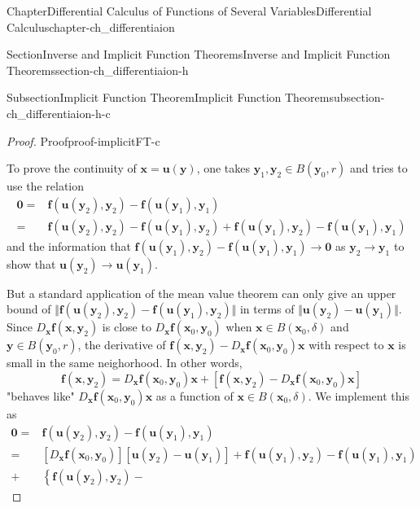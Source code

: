 \documentclass[oneside,10pt,]{book}
\numberwithin{equation}{section}
\newcommand{\bff}{\mathbf{f}}
\newcommand{\bx}{\mathbf{x}}
\newcommand{\by}{\mathbf{y}}
\newcommand{\amp}{&}
\begin{document}
\begin{chapterptx}{Chapter}{Differential Calculus of Functions of Several Variables}{}{Differential Calculus}{}{}{chapter-ch_differentiaion}
\begin{sectionptx}{Section}{Inverse and Implicit Function Theorems}{}{Inverse and Implicit Function Theorems}{}{}{section-ch_differentiaion-h}
\begin{subsectionptx}{Subsection}{Implicit Function Theorem}{}{Implicit Function Theorem}{}{}{subsection-ch_differentiaion-h-c}
\begin{proof}{Proof}{}{proof-implicitFT-c}
\par
To prove the continuity of \({\mathbf x} = {\mathbf u}({\mathbf y})\), one takes \({\mathbf y}_{1}, {\mathbf y}_{2}\in B({\mathbf y}_0, r) \) and tries to use the relation%
\begin{align*}
{\mathbf 0} =\amp {\mathbf f}({\mathbf u}({\mathbf y}_{2}), {\mathbf y}_{2})-
{\mathbf f}({\mathbf u}({\mathbf y}_{1}), {\mathbf y}_{1})\\
=\amp {\mathbf f}({\mathbf u}({\mathbf y}_{2}), {\mathbf y}_{2})-{\mathbf f}({\mathbf u}({\mathbf y}_{1}), {\mathbf y}_{2})+ {\mathbf f}({\mathbf u}({\mathbf y}_{1}), {\mathbf y}_{2})-
{\mathbf f}({\mathbf u}({\mathbf y}_{1}), {\mathbf y}_{1})
\end{align*}
and the information that \({\mathbf f}({\mathbf u}({\mathbf y}_{1}), {\mathbf y}_{2})-
{\mathbf f}({\mathbf u}({\mathbf y}_{1}), {\mathbf y}_{1}) \to \mathbf 0\) as \(\by_{2}\to \by_{1}\) to show that \({\mathbf u}({\mathbf y}_{2})\to 
{\mathbf u}({\mathbf y}_{1})\).%
\par
But a standard application of the mean value theorem can only give an upper bound of \(\Vert {\mathbf f}({\mathbf u}({\mathbf y}_{2}), {\mathbf y}_{2})-{\mathbf f}({\mathbf u}({\mathbf y}_{1}), {\mathbf y}_{2})\Vert\) in terms of \(\Vert {\mathbf u}({\mathbf y}_{2})- 
{\mathbf u}({\mathbf y}_{1})\Vert\). Since \(D_{\bx}\bff(\bx, \by_{2})\) is close to \(D_{\bx}\bff(\bx_{0}, \by_{0})\) when \(\bx \in B({\mathbf x}_{0}, \delta)\) and \(\by \in B(\by_{0}, r)\), the derivative of \(\bff(\bx, \by_{2})-D_{\bx}\bff(\bx_{0}, \by_{0})\bx\) with respect to \(\bx\) is small in the same neighorhood. In other words,%
\begin{equation*}
\bff(\bx, \by_{2})=D_{\bx}\bff(\bx_{0}, \by_{0})\bx+ \left[ \bff(\bx, \by_{2})-D_{\bx}\bff(\bx_{0}, \by_{0})\bx\right]
\end{equation*}
"behaves like" \(D_{\bx}\bff(\bx_{0}, \by_{0})\bx\) as a function of \(\bx\in B({\mathbf x}_{0}, \delta)\). We implement this as%
\begin{align*}
{\mathbf 0} =\amp {\mathbf f}({\mathbf u}({\mathbf y}_{2}), {\mathbf y}_{2})-
{\mathbf f}({\mathbf u}({\mathbf y}_{1}), {\mathbf y}_{1})\\
=\amp  \left[D_{{\mathbf x}}{\mathbf f}({\mathbf x}_{0}, {\mathbf y}_{0})\right]
\left[{\mathbf u}({\mathbf y}_{2})- {\mathbf u}({\mathbf y}_{1})\right] 
+  {\mathbf f}({\mathbf u}({\mathbf y}_{1}), {\mathbf y}_{2})-
{\mathbf f}({\mathbf u}({\mathbf y}_{1}), {\mathbf y}_{1})\\
+ \amp \left\{ {\mathbf f}({\mathbf u}({\mathbf y}_{2}), {\mathbf y}_{2})-

\end{align*}
\end{proof}
\end{subsectionptx}
\end{sectionptx}
\end{chapterptx}
\end{document}
